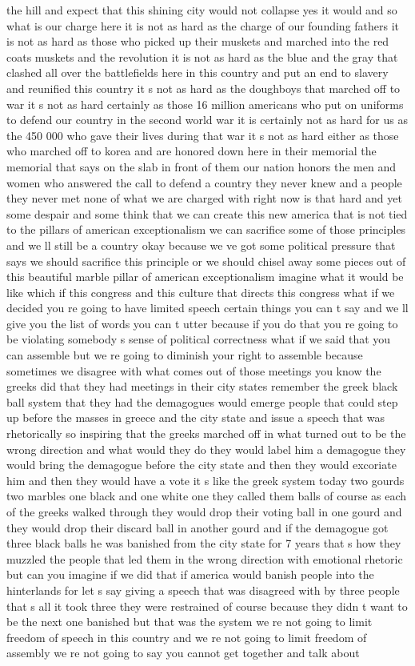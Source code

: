 \documentclass{article}
\begin{document}
the hill and expect that this shining city would not collapse yes it would and so what is our charge here it is not as hard as the charge of our founding fathers it is not as hard as those who picked up their muskets and marched into the red coats muskets and the revolution it is not as hard as the blue and the gray that clashed all over the battlefields here in this country and put an end to slavery and reunified this country it s not as hard as the doughboys that marched off to war it s not as hard certainly as those 16 million americans who put on uniforms to defend our country in the second world war it is certainly not as hard for us as the 450 000 who gave their lives during that war it s not as hard either as those who marched off to korea and are honored down here in their memorial the memorial that says on the slab in front of them our nation honors the men and women who answered the call to defend a country they never knew and a people they never met none of what we are charged with right now is that hard and yet some despair and some think that we can create this new america that is not tied to the pillars of american exceptionalism we can sacrifice some of those principles and we ll still be a country okay because we ve got some political pressure that says we should sacrifice this principle or we should chisel away some pieces out of this beautiful marble pillar of american exceptionalism imagine what it would be like which if this congress and this culture that directs this congress what if we decided you re going to have limited speech certain things you can t say and we ll give you the list of words you can t utter because if you do that you re going to be violating somebody s sense of political correctness what if we said that you can assemble but we re going to diminish your right to assemble because sometimes we disagree with what comes out of those meetings you know the greeks did that they had meetings in their city states remember the greek black ball system that they had the demagogues would emerge people that could step up before the masses in greece and the city state and issue a speech that was rhetorically so inspiring that the greeks marched off in what turned out to be the wrong direction and what would they do they would label him a demagogue they would bring the demagogue before the city state and then they would excoriate him and then they would have a vote it s like the greek system today two gourds two marbles one black and one white one they called them balls of course as each of the greeks walked through they would drop their voting ball in one gourd and they would drop their discard ball in another gourd and if the demagogue got three black balls he was banished from the city state for 7 years that s how they muzzled the people that led them in the wrong direction with emotional rhetoric but can you imagine if we did that if america would banish people into the hinterlands for let s say giving a speech that was disagreed with by three people that s all it took three they were restrained of course because they didn t want to be the next one banished but that was the system we re not going to limit freedom of speech in this country and we re not going to limit freedom of assembly we re not going to say you cannot get together and talk about 
\end{document}
